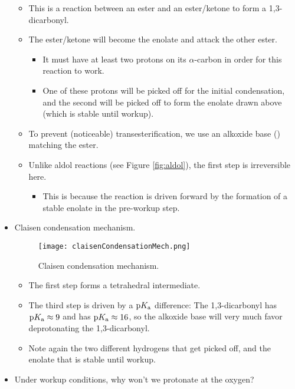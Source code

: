 \documentclass[../notes.tex]{subfiles}
\begin{document}
\begin{itemize}
\begin{figure}[h!]
        \label{fig:claisenCondensation}
    \end{figure}
    \begin{itemize}
        \item This is a reaction between an ester and an ester/ketone to form a 1,3-dicarbonyl.
        \item The ester/ketone will become the enolate and attack the other ester.
        \begin{itemize}
            \item It must have at least two protons on its $\alpha$-carbon in order for this reaction to work.
            \item One of these protons will be picked off for the initial condensation, and the second will be picked off to form the enolate drawn above (which is stable until workup).
        \end{itemize}
        \item To prevent (noticeable) transesterification, we use an alkoxide base () matching the ester.
        \item Unlike aldol reactions (see Figure \ref{fig:aldol}), the first step is irreversible here.
        \begin{itemize}
            \item This is because the reaction is driven forward by the formation of a stable enolate in the pre-workup step.
        \end{itemize}
    \end{itemize}
    \item Claisen condensation mechanism.
    \begin{figure}[h!]
        \centering
        \texttt{[image: claisenCondensationMech.png]}
        \caption{Claisen condensation mechanism.}
        \label{fig:claisenCondensationMech}
    \end{figure}
    \begin{itemize}
        \item The first step forms a tetrahedral intermediate.
        \item The third step is driven by a $\textup{p}K_\textup{a}$ difference: The 1,3-dicarbonyl has $\textup{p}K_\textup{a}\approx 9$ and  has $\textup{p}K_\textup{a}\approx 16$, so the alkoxide base will very much favor deprotonating the 1,3-dicarbonyl.
        \item Note again the two different hydrogens that get picked off, and the enolate that is stable until workup.
    \end{itemize}
    \item Under workup conditions, why won't we protonate at the oxygen?

\end{itemize}
\end{document}
